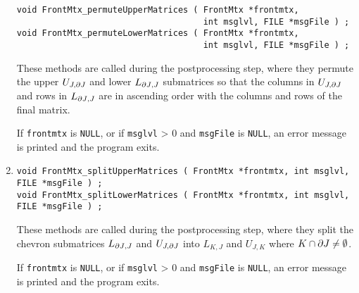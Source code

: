 \begin{enumerate}
\begin{verbatim}
void FrontMtx_permuteUpperMatrices ( FrontMtx *frontmtx, 
                                     int msglvl, FILE *msgFile ) ;
void FrontMtx_permuteLowerMatrices ( FrontMtx *frontmtx, 
                                     int msglvl, FILE *msgFile ) ;
\end{verbatim}
These methods are called during the postprocessing step, 
where they permute the upper $U_{J,{\partial{J}}}$ and lower $L_{{\partial{J}},J}$
submatrices so that
the columns in $U_{J,{\partial{J}}}$ and rows in $L_{{\partial{J}},J}$
are in ascending order with the columns and rows of the final
matrix.
\par {}
If {\tt frontmtx} is {\tt NULL},
or if {\tt msglvl} > 0 and {\tt msgFile} is {\tt NULL}, 
an error message is printed and the program exits.
\item
\begin{verbatim}
void FrontMtx_splitUpperMatrices ( FrontMtx *frontmtx, int msglvl, FILE *msgFile ) ;
void FrontMtx_splitLowerMatrices ( FrontMtx *frontmtx, int msglvl, FILE *msgFile ) ;
\end{verbatim}
These methods are called during the postprocessing step, 
where they split the chevron submatrices $L_{{\partial{J}},J}$ 
and $U_{J,{\partial{J}}}$ into $L_{K,J}$ and $U_{J,K}$ 
where $K \cap {\partial{J}} \ne \emptyset$.
\par {}
If {\tt frontmtx} is {\tt NULL},
or if {\tt msglvl} > 0 and {\tt msgFile} is {\tt NULL}, 
an error message is printed and the program exits.
\end{enumerate}
\par
